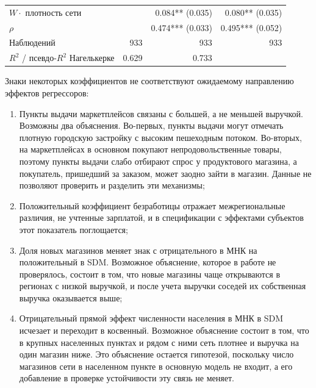 \documentclass[12pt, a4paper]{article}
\begin{document}
\begin{table}[H]
\begin{tabular}{lrrr}
        $W \cdot$ плотность сети &  & 0.084** (0.035) & 0.080** (0.035) \\
        $\rho$ &  & 0.474*** (0.033) & 0.495*** (0.052) \\
        \midrule
        Наблюдений & 933 & 933 & 933 \\
        $R^2$ / псевдо-$R^2$ Нагелькерке & 0.629 & 0.733 & \\
        \bottomrule
    \end{tabular}
    \par\vspace{1mm}{\footnotesize Примечание: в скобках стандартные ошибки; *, **, *** - значимость на уровнях 10\%, 5\% и 1\%; для МНК использованы стандартные ошибки, робастные к гетероскедастичности (HC1), для SDM ML - асимптотические стандартные ошибки максимального правдоподобия, для 2МНК - стандартные ошибки Уайта. Источник: расчеты авторов по данным X5 Group, Росстата и GeoNames.}
\end{table}

Знаки некоторых коэффициентов не соответствуют ожидаемому направлению эффектов регрессоров:

\begin{enumerate}
    \item Пункты выдачи маркетплейсов связаны с большей, а не меньшей выручкой. Возможны два
    объяснения. Во-первых, пункты выдачи могут отмечать плотную городскую застройку с высоким
    пешеходным потоком. Во-вторых, на маркетплейсах в основном покупают непродовольственные товары, поэтому
    пункты выдачи слабо отбирают спрос у продуктового магазина, а покупатель, пришедший за заказом,
    может заодно зайти в магазин. Данные не позволяют проверить и разделить эти механизмы;
    \item Положительный коэффициент безработицы отражает межрегиональные различия, не учтенные
    зарплатой, и в спецификации с эффектами субъектов этот показатель поглощается;
    \item Доля новых магазинов меняет знак с отрицательного в МНК на положительный в SDM. Возможное
    объяснение, которое в работе не проверялось, состоит в том, что новые магазины чаще
    открываются в регионах с низкой выручкой, и после учета выручки соседей их собственная выручка
    оказывается выше;
    \item Отрицательный прямой эффект численности населения в МНК в SDM исчезает и переходит в
    косвенный. Возможное объяснение состоит в том, что в крупных населенных пунктах и рядом с ними
    сеть плотнее и выручка на один магазин ниже. Это объяснение остается гипотезой, поскольку
    число магазинов сети в населенном пункте в основную модель не входит, а его добавление в
    проверке устойчивости эту связь не меняет.
\end{enumerate}
\end{document}
